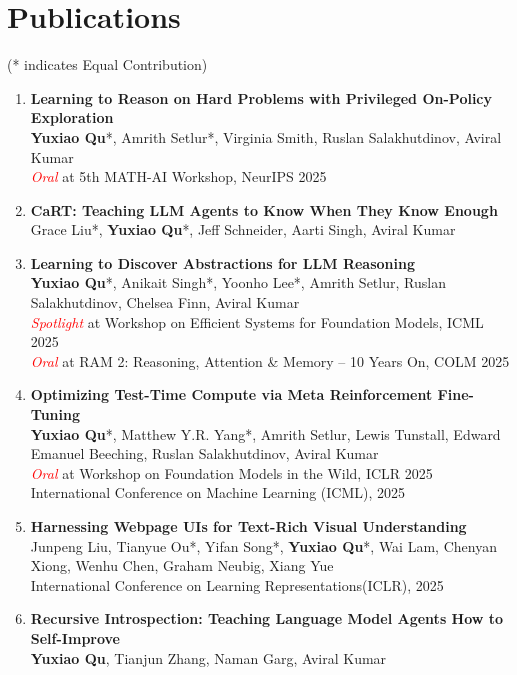 \documentclass[11pt,letterpaper,roman,colorlinks=true,urlcolor=brown]{moderncv}
\begin{document}
\section{Publications}
(* indicates Equal Contribution)
\begin{enumerate}
    \item \textbf{Learning to Reason on Hard Problems with Privileged On-Policy Exploration}\\
    \textbf{Yuxiao Qu}*, Amrith Setlur*, Virginia Smith, Ruslan Salakhutdinov, Aviral Kumar\\
    \textcolor{red}{\textit{Oral}} at 5th MATH-AI Workshop, NeurIPS 2025
    \item \textbf{CaRT: Teaching LLM Agents to Know When They Know Enough}\\
    Grace Liu*, \textbf{Yuxiao Qu}*, Jeff Schneider, Aarti Singh, Aviral Kumar
    \item \textbf{Learning to Discover Abstractions for LLM Reasoning}\\
    \textbf{Yuxiao Qu}*, Anikait Singh*, Yoonho Lee*, Amrith Setlur, Ruslan Salakhutdinov, Chelsea Finn, Aviral Kumar\\
    \textcolor{red}{\textit{Spotlight}} at Workshop on Efficient Systems for Foundation Models, ICML 2025\\
    \textcolor{red}{\textit{Oral}} at RAM 2: Reasoning, Attention \& Memory – 10 Years On, COLM 2025
    \item \textbf{Optimizing Test-Time Compute via Meta Reinforcement Fine-Tuning}\\
    \textbf{Yuxiao Qu}*, Matthew Y.R. Yang*, Amrith Setlur, Lewis Tunstall, Edward Emanuel Beeching, Ruslan Salakhutdinov, Aviral Kumar
    \\
    \textcolor{red}{\textit{Oral}} at Workshop on Foundation Models in the Wild, ICLR 2025\\
    International Conference on Machine Learning (ICML), 2025
    \item \textbf{Harnessing Webpage UIs for Text-Rich Visual Understanding}\\
    Junpeng Liu, Tianyue Ou*, Yifan Song*, \textbf{Yuxiao Qu}*, Wai Lam, Chenyan Xiong, Wenhu Chen, Graham Neubig, Xiang Yue
    \\
    International Conference on Learning Representations(ICLR), 2025
    \item \textbf{Recursive Introspection: Teaching Language Model Agents How to Self-Improve}\\
    \textbf{Yuxiao Qu}, Tianjun Zhang, Naman Garg, Aviral Kumar

\end{enumerate}
\end{document}
